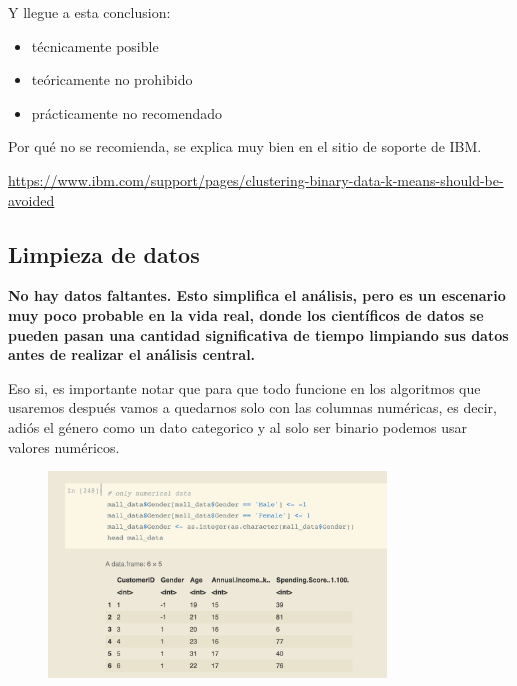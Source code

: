 \documentclass[12pt, fleqn]{report}                             %
\theoremstyle{break}                                            %
\begin{document}
            Y llegue a esta conclusion:
            \begin{itemize}
                \item técnicamente posible
                \item teóricamente no prohibido
                \item prácticamente no recomendado
            \end{itemize}
                
            Por qué no se recomienda, se explica muy bien en el sitio de soporte de IBM. 

            \url{https://www.ibm.com/support/pages/clustering-binary-data-k-means-should-be-avoided}


            \subsection{Limpieza de datos}
                
            \textbf{No hay datos faltantes. 
                Esto simplifica el análisis, pero es un escenario muy poco probable
                en la vida real, donde los científicos de datos se pueden pasan una cantidad significativa de
                tiempo limpiando
                sus datos antes de realizar el análisis central.}

                \clearpage
                
                Eso si, es importante notar que para que todo funcione en los algoritmos que usaremos después
                vamos a quedarnos solo con las columnas numéricas, es decir, adiós el género como un dato categorico
                y al solo ser binario podemos usar valores numéricos.

                \begin{figure}[ht!]
                    \centering
                    \includegraphics[width=0.8\textwidth]{miss}
                \end{figure}
\end{document}
